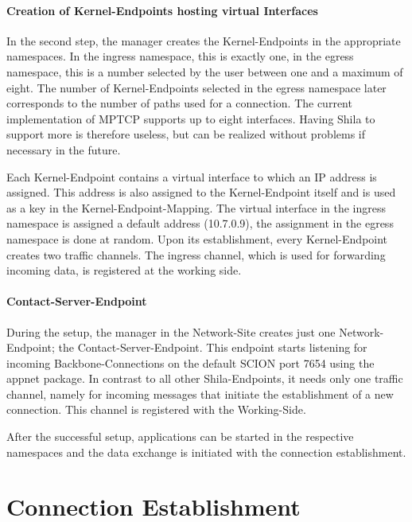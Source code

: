 \paragraph{Creation of Kernel-Endpoints hosting virtual Interfaces}

In the second step, the manager creates the Kernel-Endpoints in the appropriate namespaces. In the ingress namespace, this is exactly one, in the egress namespace, this is a number selected by the user between one and a maximum of eight. The number of Kernel-Endpoints selected in the egress namespace later corresponds to the number of paths used for a connection. The current implementation of MPTCP supports up to eight interfaces. Having Shila to support more is therefore useless, but can be realized without problems if necessary in the future.

Each Kernel-Endpoint contains a virtual interface to which an IP address is assigned. This address is also assigned to the Kernel-Endpoint itself and is used as a key in the Kernel-Endpoint-Mapping. The virtual interface in the ingress namespace is assigned a default address (10.7.0.9), the assignment in the egress namespace is done at random. Upon its establishment, every Kernel-Endpoint creates two traffic channels. The ingress channel, which is used for forwarding incoming data, is registered at the working side. 

\paragraph{Contact-Server-Endpoint}

During the setup, the manager in the Network-Site creates just one Network-Endpoint; the Contact-Server-Endpoint. This endpoint starts listening for incoming Backbone-Connections on the default SCION port 7654 using the appnet package. In contrast to all other Shila-Endpoints, it needs only one traffic channel, namely for incoming messages that initiate the establishment of a new connection. This channel is registered with the Working-Side.

After the successful setup, applications can be started in the respective namespaces and the data exchange is initiated with the connection establishment.

\section{Connection Establishment}
\label{sec:ImplementationConnectionEstablishment}

